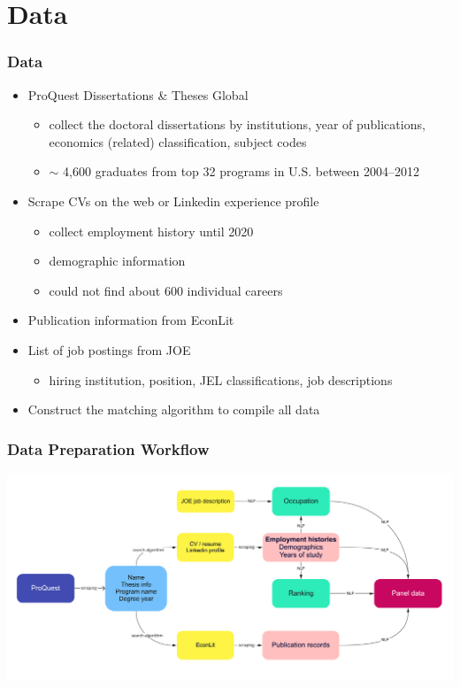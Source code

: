 \documentclass[10pt,svgnames,fragile]{beamer}
\begin{document}
\section{Data}
\begin{frame}[label=Data]
	\frametitle{Data}
		\begin{itemize}
			\item ProQuest Dissertations \& Theses Global
			\begin{itemize}
				\vspace{1 mm}
				\item collect the doctoral dissertations by institutions, year of publications, economics (related) classification, subject codes
				\vspace{1 mm}
				\item $\sim$ 4,600 graduates from top 32 programs in U.S. between 2004--2012 
			\end{itemize}
\vfill
			\item Scrape CVs on the web or Linkedin experience profile
			\begin{itemize}
				\vspace{1 mm}
				\item collect employment history until 2020
				\vspace{1 mm}
				\item demographic information
				\vspace{1 mm}
				\item could not find about 600 individual careers
			\end{itemize}
\vfill
			\item Publication information from EconLit
\vfill
			\item List of job postings from JOE
			\begin{itemize}
				\vspace{1 mm}
				\item hiring institution, position, JEL classifications, job descriptions  
			\end{itemize}		
			
\vfill
			\item Construct the matching algorithm to compile all data %
\vfill
		\end{itemize}
	\end{frame}

\begin{frame}
	\frametitle{Data Preparation Workflow}
	\includegraphics[width=\linewidth]{pic_flow.jpg}
\end{frame}
\end{document}
